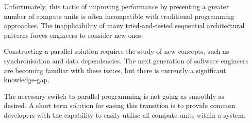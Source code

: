 Unfortunately, this tactic of improving performance by presenting a greater number of compute units is often incompatible with traditional programming approaches. The inapplicability of many tried-and-tested sequential architectural patterns forces engineers to consider new ones.

Constructing a parallel solution requires the study of new concepts, such as synchronisation and data dependencies. The next generation of software engineers are becoming familiar with these issues, but there is currently a significant knowledge-gap.

The necessary switch to parallel programming is not going as smoothly as desired. A short term solution for easing this transition is to provide common developers with the capability to easily utilise all compute-units within a system.

